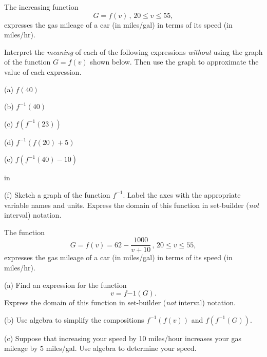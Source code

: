 \documentclass{ximera}
\newcommand{\pskip}{\vskip 0.1 in}
\begin{document}
\begin{example}  \label{Ex:9dfctghgh}
The increasing function
\[
   G = f(v) \,  , \, 20\leq v \leq 55 ,
\]
expresses the gas mileage of a car (in  miles/gal) in terms of its speed (in miles/hr). 

Interpret the \emph{meaning} of each of the following expressions \emph{without} using the graph of the function $G=f(v)$ shown below. Then use the graph to approximate the value of each expression.

(a) $f(40)$

(b) $f^{-1}(40)$

(c) $f(f^{-1}(23))$

(d) $f^{-1}(f(20) + 5)$

(e) $f(f^{-1}(40)-10)$

\begin{onlineOnly}
    \begin{center}
\end{center}
\end{onlineOnly}

\pskip

(f) Sketch a graph of the function $f^{-1}$. Label the axes with the appropriate variable names and units. Express the domain of this function in set-builder (\emph{not} interval) notation.

\end{example}

\begin{example}  \label{Ex:oodfdsfo}
The function
\[
   G = f(v) = 62 - \frac{1000}{v+10}\,  , \, 20\leq v \leq 55 ,
\]
expresses the gas mileage of a car (in  miles/gal) in terms of its speed (in miles/hr). 

(a) Find an expression for the function 
\[
    v = f{-1}(G).
\]
Express the domain of this function in set-builder (\emph{not} interval) notation.

(b) Use algebra to simplify the compositions $f^{-1}(f(v))$ and $f(f^{-1}(G))$. 
  
(c) Suppose that increasing your speed by 10 miles/hour increases  your gas mileage by $5$ miles/gal. Use algebra to determine your speed.


\end{example}
\end{document}
